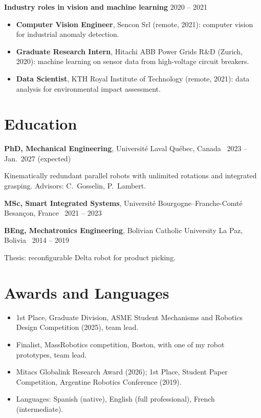 \documentclass[10pt,letterpaper]{article}
\begin{document}
\vspace{3pt}
\textbf{Industry roles in vision and machine learning} \hfill {\color{muted}2020 -- 2021}\par
\begin{itemize}
\item \textbf{Computer Vision Engineer}, Sencon Srl (remote, 2021): computer vision for industrial anomaly detection.
\item \textbf{Graduate Research Intern}, Hitachi ABB Power Grids R\&D (Zurich, 2020): machine learning on sensor data from high-voltage circuit breakers.
\item \textbf{Data Scientist}, KTH Royal Institute of Technology (remote, 2021): data analysis for environmental impact assessment.
\end{itemize}

\section{Education}
\textbf{PhD, Mechanical Engineering}, Universit\'e Laval \hfill {\color{muted}Qu\'ebec, Canada \textbar\ 2023 -- Jan.\ 2027 (expected)}\par
{\small Kinematically redundant parallel robots with unlimited rotations and integrated grasping. Advisors: C.~Gosselin, P.~Lambert.}\par\vspace{2pt}
\textbf{MSc, Smart Integrated Systems}, Universit\'e Bourgogne--Franche-Comt\'e \hfill {\color{muted}Besan\c{c}on, France \textbar\ 2021 -- 2023}\par\vspace{2pt}
\textbf{BEng, Mechatronics Engineering}, Bolivian Catholic University \hfill {\color{muted}La Paz, Bolivia \textbar\ 2014 -- 2019}\par
{\small Thesis: reconfigurable Delta robot for product picking.}

\section{Awards and Languages}
\begin{itemize}
\item 1st Place, Graduate Division, ASME Student Mechanisms and Robotics Design Competition (2025), team lead.
\item Finalist, MassRobotics competition, Boston, with one of my robot prototypes, team lead.
\item Mitacs Globalink Research Award (2026); 1st Place, Student Paper Competition, Argentine Robotics Conference (2019).
\item Languages: Spanish (native), English (full professional), French (intermediate).
\end{itemize}
\end{document}
